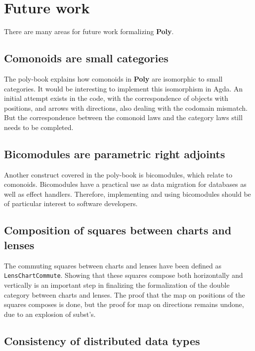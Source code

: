 

\section{Future work}
There are many areas for future work formalizing \textbf{Poly}. 

\subsection{Comonoids are small categories}
The poly-book explains how comonoids in \textbf{Poly} are isomorphic to small categories. It would be interesting to implement this isomorphism in Agda. An initial attempt exists in the code, with the correspondence of objects with positions, and arrows with directions, also dealing with the codomain mismatch. But the correspondence between the comonoid laws and the category laws still needs to be completed.

\subsection{Bicomodules are parametric right adjoints}
Another construct covered in the poly-book is bicomodules, which relate to comonoids. Bicomodules have a practical use as data migration for databases \cite{bicomodulesBlog} as well as effect handlers. Therefore, implementing and using bicomodules should be of particular interest to software developers.

\subsection{Composition of squares between charts and lenses} \label{section:commutingSquaresCompose}
The commuting squares between charts and lenses have been defined as \texttt{LensChartCommute}. Showing that these squares compose both horizontally and vertically is an important step in finalizing the formalization of the double category between charts and lenses. The proof that the map on positions of the squares composes is done, but the proof for map on directions remains undone, due to an explosion of subst's.

\subsection{Consistency of distributed data types}


